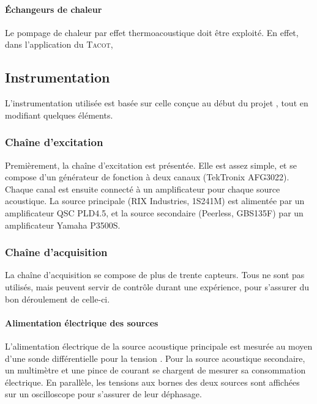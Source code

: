 \paragraph*{\'Echangeurs de chaleur}
Le pompage de chaleur par effet thermoacoustique doit être exploité. En effet, dans l'application du \textsc{Tacot}, 

\subsection{Instrumentation}
L'instrumentation utilisée est basée sur celle conçue au début du projet \cite{ramadan_design_2021}, tout en modifiant quelques éléments.\bigskip


\subsubsection{Chaîne d'excitation}
Premièrement, la chaîne d'excitation est présentée. Elle est assez simple, et se compose d'un générateur de fonction à deux canaux (TekTronix AFG3022). Chaque canal est ensuite connecté à un amplificateur pour chaque source acoustique. La source principale (RIX Industries, 1S241M) est alimentée par un amplificateur QSC PLD4.5, et la source secondaire (Peerless, GBS135F) par un amplificateur Yamaha P3500S.\medskip


\subsubsection{Chaîne d'acquisition}
La chaîne d'acquisition se compose de plus de trente capteurs. Tous ne sont pas utilisés, mais peuvent servir de contrôle durant une expérience, pour s'assurer du bon déroulement de celle-ci.

\paragraph*{Alimentation électrique des sources} L'alimentation électrique de la source acoustique principale est mesurée au moyen d'une sonde différentielle pour la tension . Pour la source acoustique secondaire, un multimètre et une pince de courant se chargent de mesurer sa consommation électrique. En parallèle, les tensions aux bornes des deux sources sont affichées sur un oscilloscope pour s'assurer de leur déphasage.

